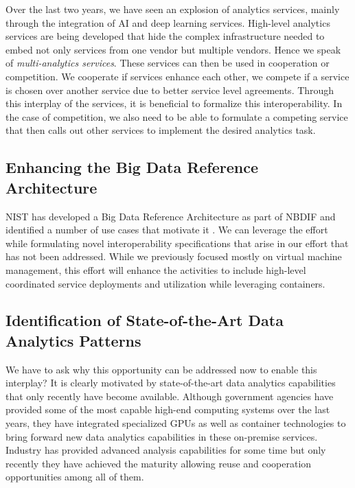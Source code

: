 Over the last two years, we have seen an explosion of analytics
services, mainly through the integration of AI and deep learning
services. High-level analytics services are being developed that hide the
complex infrastructure needed to embed not only services from one
vendor but multiple vendors. Hence we speak of {\em multi-analytics
  services}. These services can then be used in cooperation or
competition. We cooperate if services enhance each other, we compete
if a service is chosen over another service due to better service
level agreements. Through this interplay of the services, it is
beneficial to formalize this interoperability. In the case of competition,
we also need to be able to formulate a competing service that then
calls out other services to implement the desired analytics task.

\subsection{Enhancing the Big Data Reference Architecture}
\label{s:arch}

NIST has developed a Big Data Reference Architecture as part of
NBDIF\cite{nist-v6} and identified a number of use cases that motivate
it \cite{nist-v3}. We can leverage the effort
~\cite{nist-v1,nist-v2,nist-v3,nist-v4,nist-v5,nist-v6,nist-v7,nist-v8,nist-v9}
while formulating novel interoperability specifications that arise in
our effort that has not been addressed. While we previously focused
mostly on virtual machine management, this effort will enhance the
activities to include high-level coordinated service deployments and
utilization while leveraging containers.

\subsection{Identification of State-of-the-Art Data Analytics Patterns}

We have to ask why this opportunity can be addressed now to enable
this interplay?  It is clearly motivated by state-of-the-art data
analytics capabilities that only recently have become available.
Although government agencies have provided some of the most capable
high-end computing systems over the last years, they have integrated
specialized GPUs as well as container technologies to bring forward
new data analytics capabilities in these on-premise services. Industry
has provided advanced analysis capabilities for some time but only
recently they have achieved the maturity allowing reuse and
cooperation opportunities among all of them.

